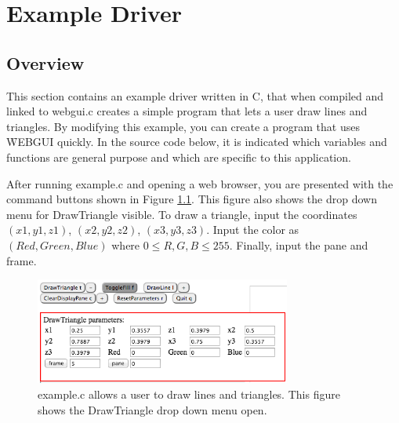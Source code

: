 \cleardoublepage
\setcounter{chapter}{5} %
\setcounter{section}{6} %
\chapter{Example Driver}
\setcounter{page}{49} %

 
\section{Overview}
This section contains an example driver written in C, that when compiled and linked to webgui.c creates a simple
program that lets a user draw lines and triangles. By modifying this example, you can create a program that uses
\f{WEBGUI} quickly. In the source code below, it is indicated which variables and functions
are general purpose and which are specific to this application. 

After running example.c and opening a web browser,
you are presented with the command buttons shown in Figure \ref{fig:6-1}. This figure also shows the drop down menu
for DrawTriangle visible. To draw a triangle, input the coordinates $(x1,y1,z1)$, $(x2,y2,z2)$, $(x3,y3,z3)$. Input 
the color as $(Red, Green, Blue)$ where $0 \leq R,G,B \leq 255$. Finally, input the pane and frame. 

\begin{figure}[H]
\centering
\includegraphics[width=0.75\textwidth]{pix/driver2.png}
\caption{example.c allows a user to draw lines and triangles. This figure shows the DrawTriangle drop down menu open.}
\label{fig:6-1}
\end{figure} 

